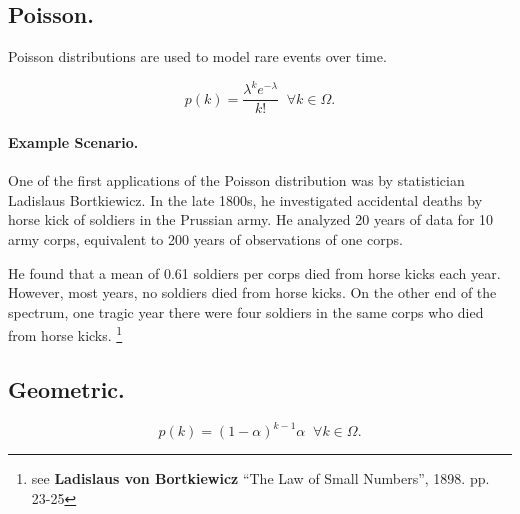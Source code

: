 \subsection{Poisson.}
\label{subsec:poisson}
Poisson distributions are used to model rare events over time. 

\[p(k) = \frac{\lambda^ke^{-\lambda}}{k!} \;\; \forall k\in\Omega.\]

\paragraph{Example Scenario.} 
One of the first applications of the Poisson distribution was by statistician Ladislaus Bortkiewicz. 
In the late 1800s, he investigated accidental deaths by horse kick of soldiers in the Prussian army. 
He analyzed 20 years of data for 10 army corps, equivalent to 200 years of observations of one corps.

He found that a mean of 0.61 soldiers per corps died from horse kicks each year. 
However, most years, no soldiers died from horse kicks. 
On the other end of the spectrum, 
one tragic year there were four soldiers in the same corps who died from horse kicks.%
\footnote{see \textbf{Ladislaus von Bortkiewicz} ``The Law of Small Numbers'', 1898. pp. 23-25}

\begin{center}
\end{center}



\subsection{Geometric.}

\[p(k) = (1-\alpha)^{k-1}\alpha \;\; \forall k\in\Omega.\]


